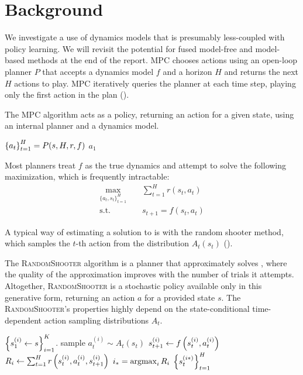 \documentclass{article}
\begin{document}
\section{Background}
We investigate a use of dynamics models that is presumably less-coupled with policy learning. We will revisit the potential for fused model-free and model-based methods at the end of the report. MPC chooses actions using an open-loop planner $P$ that accepts a dynamics model $f$ and a horizon $H$ and returns the next $H$ actions to play. MPC iteratively queries the planner at each time step, playing only the first action in the plan ().

\begin{algorithm}
\caption{The \textsc{MPC} algorithm acts as a policy, returning an action for a given state, using an internal planner and a dynamics model.} \label{alg:mpc}
\begin{algorithmic}[1]
\State $\left\{{a_t}\right\}_{t=1}^H=P(s, H, r, f)$
\State\Return $a_1$
\EndProcedure
\end{algorithmic}
\end{algorithm}

Most planners treat $f$ as the true dynamics and attempt to solve the following maximization, which is frequently intractable:
\begin{align}
    \max_{\{a_t,s_t\}_{t=1}^H}&\;\;\;\; \sum_{t=1}^H r(s_t, a_t) \label{eq:unconstrained}\\
    \text{s.t.} &\;\;\;\; s_{t+1} = f(s_t,a_t)\nonumber
\end{align}

A typical way of estimating a solution to  is with the random shooter method, which samples the $t$-th action from the distribution $A_t(s_t)$ ().

\begin{algorithm}
\caption{The \textsc{RandomShooter} algorithm is a planner that approximately solves , where the quality of the approximation improves with the number of trials it attempts. Altogether, \textsc{RandomShooter} is a stochastic policy available only in this generative form, returning an action $a$ for a provided state $s$. The \textsc{RandomShooter}'s properties highly depend on the state-conditional time-dependent action sampling distributions $A_t$.}\label{alg:rs}
\begin{algorithmic}[1]
\State $\left\{{s_1^{(i)}\gets s}\right\}_{i=1}^K$.
\State sample $a_t^{(i)}\sim A_t(s_t)$
\State $s_{t+1}^{(i)}\gets f\left({s_t^{(i)},a_t^{(i)}}\right)$
\EndFor
\State $R_i\gets\sum_{t=1}^{H}r\left({s_{t}^{(i)},a_t^{(i)},s_{t+1}^{(i)}}\right)$
\EndFor
\State $i_*=\operatorname*{argmax}_i R_i$
\State \Return $\left\{{s^{(i*)}_t}\right\}_{t=1}^H$ %
\EndProcedure
\end{algorithmic}
\end{algorithm}
\end{document}

